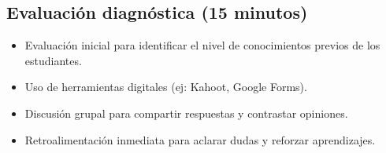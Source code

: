 \subsection*{Evaluación diagnóstica (15 minutos)}
\begin{itemize}
    \item Evaluación inicial para identificar el nivel de conocimientos previos de los estudiantes.
    \item Uso de herramientas digitales (ej: Kahoot, Google Forms).
    \item Discusión grupal para compartir respuestas y contrastar opiniones.
    \item Retroalimentación inmediata para aclarar dudas y reforzar aprendizajes.
\end{itemize}